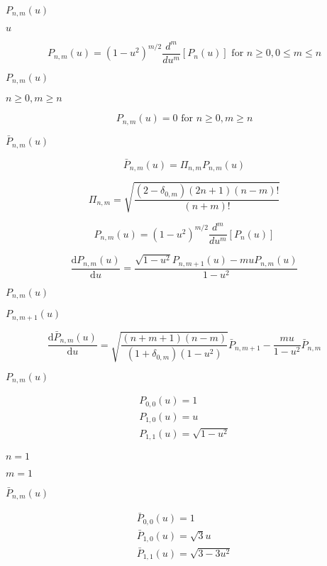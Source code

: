 \documentclass{article}
\begin{document}
$ P _{ n, m }( u ) $
\pagebreak

$ u $
\pagebreak

\[ P _{ n, m } ( u ) = ( 1 - u ^ 2 ) ^ { m / 2 } \frac{ d ^ m }{ du ^ m } \left[ P_n ( u ) \right] \textrm{ for }n \geq 0, 0 \leq m \leq n \]
\pagebreak

$ P_{ n, m }( u ) $
\pagebreak

$ n \geq 0, m \geq n $
\pagebreak

\[ P _{ n, m } ( u ) = 0 \textrm{ for }n \geq 0, m \geq n \]
\pagebreak

$ \bar{ P }_{ n, m }( u ) $
\pagebreak

\[ \bar{ P }_{ n, m } ( u ) = \Pi_{ n, m } P_{ n, m } ( u ) \]
\pagebreak

\[ \Pi_{ n, m } = \sqrt{ \frac{ ( 2 - \delta_{ 0, m } ) ( 2 n + 1 ) ( n - m )! } { ( n + m )! } } \]
\pagebreak

\[ P _{ n, m } ( u ) = ( 1 - u ^ 2 ) ^ { m / 2 } \frac{ d ^ m }{ du ^ m } \left[ P_n ( u ) \right] \]
\pagebreak

\[ \frac{ \mathrm{ d } P_{ n, m } ( u ) }{ \mathrm{ d } u } = \frac{ \sqrt{ 1 - u ^ 2 } P_{ n, m + 1 }( u ) - m u P_{ n, m }( u ) }{ 1 - u ^ 2 } \]
\pagebreak

$ P_{ n, m } ( u ) $
\pagebreak

$ P_{ n, m + 1 } ( u ) $
\pagebreak

\[ \frac{ \mathrm{ d } \bar{ P }_{ n, m } ( u ) }{ \mathrm{ d } u } = \sqrt{ \frac{ ( n + m + 1 )( n - m ) }{ ( 1 + \delta_{ 0, m } ) ( 1 - u^2 ) } } \bar{ P }_{ n, m + 1 } - \frac{ m u }{ 1 - u^2 } \bar{ P }_{ n, m } \]
\pagebreak

$ P_{ n, m }(u) $
\pagebreak

\begin{eqnarray*} P_{ 0, 0 }( u ) = 1 \\ P_{ 1, 0 }( u ) = u \\ P_{ 1, 1 }( u ) = \sqrt{ 1 - u^2 } \end{eqnarray*}
\pagebreak

$ n = 1 $
\pagebreak

$ m = 1 $
\pagebreak

$ \bar{ P }_{ n, m }(u) $
\pagebreak

\begin{eqnarray*} \bar{ P }_{ 0, 0 }( u ) = 1 \\ \bar{ P }_{ 1, 0 }( u ) = \sqrt{ 3 } u \\ \bar{ P }_{ 1, 1 }( u ) = \sqrt{ 3 - 3 u^2 } \end{eqnarray*}
\pagebreak
\end{document}
